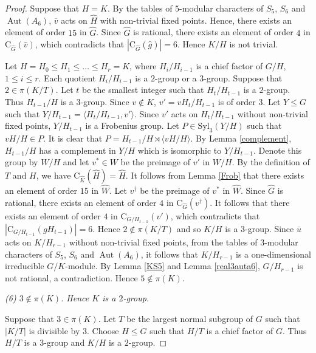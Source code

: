 \documentclass[11pt]{article}
\providecommand{\Syl}{{\mathrm{Syl}}}
\providecommand{\C}{{\mathrm{C}}}
\providecommand{\Aut}{{\operatorname{Aut}}}
\providecommand{\gen}[1]{\langle #1 \rangle} %
\providecommand{\gen}[1]{\langle #1 \rangle} %
\providecommand{\gen}[1]{\langle #1 \rangle} %
\providecommand{\olu}{{\overline{u}}}
\providecommand{\olv}{{\overline{v}}}
\providecommand{\whg}{{\widehat{g}}}
\providecommand{\whv}{{\widehat{v}}}
\providecommand{\whG}{{\widehat{G}}}
\providecommand{\whH}{{\widehat{H}}}
\providecommand{\whK}{{\widehat{K}}}
\providecommand{\whW}{{\widehat{W}}}
\begin{document}
\begin{proof}
    Suppose that $H=K$.
    By the tables of $5$-modular characters of $S_5$, $S_6$ and $\Aut(A_6)$,
    $\olv$ acts on $\whH$ with non-trivial fixed points.
    Hence, there exists an element of order $15$ in $\whG$.
    Since $\whG$ is rational, there exists an element of order $4$ in $\C_{\whG}(\whv)$,
    which contradicts that $|\C_{\whG}(\whg)|=6$.
    Hence $K/H$ is not trivial.
    
    Let $H=H_0\leq H_1\leq \ldots \leq H_r=K$, 
    where $H_i/H_{i-1}$ is a chief factor of $G/H$, $1\leq i\leq r$.
    Each quotient $H_i/H_{i-1}$ is a $2$-group or a $3$-group.
    Suppose that $2\in \pi(K/T)$.
    Let $t$ be the smallest integer such that $H_t/H_{t-1}$ is a $2$-group.
    Thus $H_{t-1}/H$ is a $3$-group.
    Since $v\notin K$, $v'=vH_t/H_{t-1}$ is of order $3$.
    Let $Y\leq G$ such that $Y/H_{t-1}=\gen{H_t/H_{t-1},v'}$.
    Since $v'$ acts on $H_t/H_{t-1}$ without non-trivial fixed points,
    $Y/H_{t-1}$ is a Frobenius group.
    Let $P\in \Syl_3(Y/H)$ such that $vH/H\in P$.
    It is clear that $P=H_{t-1}/H \rtimes \gen{vH/H}$.
    By Lemma \ref{complement}, 
    $ H_{t-1}/H$ has a complement in $Y/H$ which is isomorphic to $Y/H_{t-1}$.
    Denote this group by $W/H$ and let $v^*\in W$ be the preimage of $v'$ in $W/H$.
    By the definition of $T$ and $H$, we have $\C_{\whK}(\whH)=\whH$.
    It follows from Lemma \ref{Frob} that there exists an element of order $15$ in $\whW$.
    Let $v^\dagger$ be the preimage of $v^*$ in $\whW$.
    Since $\whG$ is rational, there exists an element of order $4$ in $\C_{\whG}(v^\dagger)$.
    It follows that there exists an element of order $4$ in $\C_{G/H_{t-1}}(v')$,
    which contradicts that $|\C_{G/H_{t-1}}(gH_{t-1})|=6$.
    Hence $2\notin \pi(K/T)$ and so $K/H$ is a $3$-group.
    Since $\olu$ acts on $K/H_{r-1}$ without non-trivial fixed points, 
    from the tables of $3$-modular characters of $S_5$, $S_6$ and $\Aut(A_6)$, 
    it follows that $K/H_{r-1}$ is a one-dimensional irreducible $G/K$-module.
    By Lemma \ref{KS5} and Lemma \ref{real3auta6}, $G/H_{r-1}$ is not rational, a contradiction.
    Hence $5\notin \pi(K)$.

    
    
\medskip
{\sl (6) $3\notin \pi(K)$. Hence $K$ is a $2$-group.}  

    Suppose that $3\in \pi(K)$.
    Let $T$ be the largest normal subgroup of $G$ such that $|K/T|$ is divisible by $3$.
    Choose $H\leq G$ such that $H/T$ is a chief factor of $G$.
    Thus $H/T$ is a $3$-group and $K/H$ is a $2$-group.


\end{proof}
\end{document}
